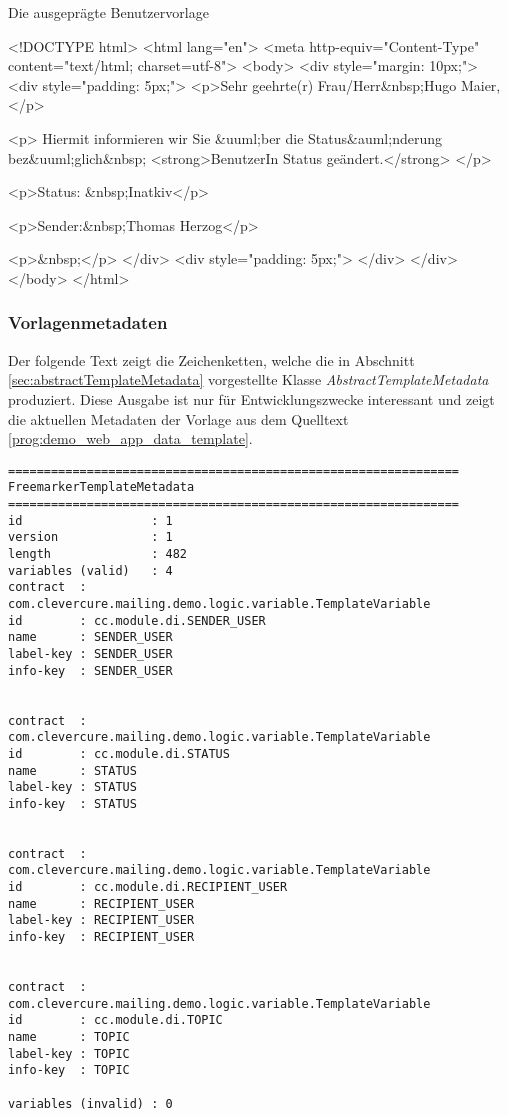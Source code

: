 \begin{program}[h]
\caption{Die ausgeprägte Benutzervorlage}
\label{prog:demo_web_app_data_parsed_template}
\begin{HtmlCode}
<!DOCTYPE html>
<html lang="en">
    <meta http-equiv="Content-Type" content="text/html; charset=utf-8">
<body>
<div style="margin: 10px;">
    <div style="padding: 5px;">
        <p>Sehr geehrte(r) Frau/Herr&nbsp;Hugo Maier,</p>

        <p>
            Hiermit informieren wir Sie &uuml;ber die 
            Status&auml;nderung bez&uuml;glich&nbsp;
            <strong>BenutzerIn Status geändert.</strong>
        </p>

        <p>Status: &nbsp;Inatkiv</p>

        <p>Sender:&nbsp;Thomas Herzog</p>

        <p>&nbsp;</p>
    </div>
    <div style="padding: 5px;">
    </div>
</div>
</body>
</html>
\end{HtmlCode}
\end{program}

\subsubsection{Vorlagenmetadaten}
Der folgende Text zeigt die Zeichenketten, welche die in Abschnitt \ref{sec:abstractTemplateMetadata} vorgestellte Klasse \emph{AbstractTemplateMetadata} produziert. Diese Ausgabe ist nur für Entwicklungszwecke interessant und zeigt die aktuellen Metadaten der Vorlage aus dem Quelltext  \ref{prog:demo_web_app_data_template}.

\begingroup
    \fontsize{9pt}{11pt}\selectfont
    \begin{verbatim}  
===============================================================
FreemarkerTemplateMetadata
===============================================================
id                  : 1
version             : 1
length              : 482
variables (valid)   : 4
contract  : com.clevercure.mailing.demo.logic.variable.TemplateVariable
id        : cc.module.di.SENDER_USER
name      : SENDER_USER
label-key : SENDER_USER
info-key  : SENDER_USER


contract  : com.clevercure.mailing.demo.logic.variable.TemplateVariable
id        : cc.module.di.STATUS
name      : STATUS
label-key : STATUS
info-key  : STATUS


contract  : com.clevercure.mailing.demo.logic.variable.TemplateVariable
id        : cc.module.di.RECIPIENT_USER
name      : RECIPIENT_USER
label-key : RECIPIENT_USER
info-key  : RECIPIENT_USER


contract  : com.clevercure.mailing.demo.logic.variable.TemplateVariable
id        : cc.module.di.TOPIC
name      : TOPIC
label-key : TOPIC
info-key  : TOPIC

variables (invalid) : 0
    \end{verbatim}  
\endgroup

